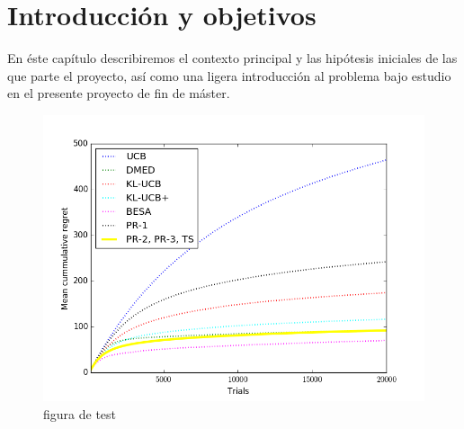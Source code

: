 \graphicspath{{capitulos/Capitulo1-Introduccion/recursos/}}

\section{Introducción y objetivos}

En éste capítulo describiremos el contexto principal y las hipótesis iniciales de las que parte el proyecto, así como una ligera introducción al problema bajo estudio en el presente proyecto de fin de máster.

\begin{figure}
	\centering
	\includegraphics[width=0.7\linewidth]{Figure1a}
	\caption{ figura de test}
	\label{fig:figure1a}
\end{figure}
